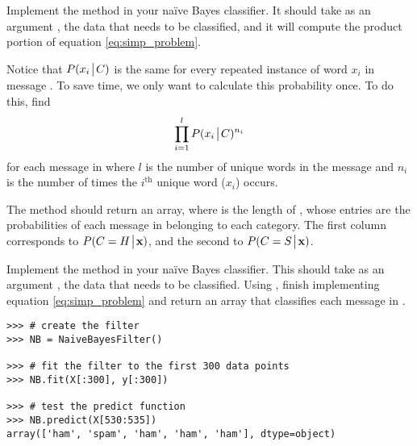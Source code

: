 \begin{problem}\label{NB:prob_predict_proba}
Implement the  method in your naïve Bayes classifier. 
It should take as an argument , the data that needs to be classified, and it will compute the product portion of equation \ref{eq:simp_problem}.

Notice that $P(x_i \!\mathrel{\big|}\! C)$ is the same for every repeated instance of word $x_i$ in message .
To save time, we only want to calculate this probability once.
To do this, find 
\begin{align*}
    \prod_{i=1}^{l}P(x_i \!\mathrel{\big|}\! C)^{n_i}
\end{align*}
for each message  in  where $l$ is the number of unique words in the message and $n_i$ is the number of times the $i^{\text{th}}$ unique word ($x_i$) occurs. 

The method should return an  array, where  is the length of , whose entries are the probabilities of each message  in  belonging to each category.
The first column corresponds to $P(C=H \!\mathrel{\big|}\! \mathbf{x})$, and the second to $P(C=S \!\mathrel{\big|}\! \mathbf{x})$.
\end{problem}

\begin{problem}\label{NB:prob_predict}
Implement the  method in your naïve Bayes classifier. 
This should take as an argument , the data that needs to be classified. 
Using , finish implementing equation \ref{eq:simp_problem} and return an array that classifies each message  in .

\begin{lstlisting}
>>> # create the filter
>>> NB = NaiveBayesFilter()

>>> # fit the filter to the first 300 data points
>>> NB.fit(X[:300], y[:300])

>>> # test the predict function
>>> NB.predict(X[530:535])
array(['ham', 'spam', 'ham', 'ham', 'ham'], dtype=object)

\end{lstlisting}

\end{problem}

